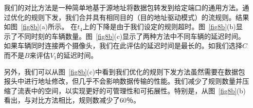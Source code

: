 我们的对比方法是一种简单地基于源地址将数据包转发到给定端口的通用方法。通过优化的规则下发，我们合并具有相同目的（目的地址驱动模式）的流规则。结果如图~\ref{fig8b}(a)所示。 在$t_ {4}$上的下降是由于我们设定的规则超时。图~\ref{fig8b}(b)显示了不同时刻的车辆数量。图~\ref{fig8b}(c)显示了两种方法中不同车辆的延迟时间。如果车辆同时连接两个摄像头，我们在此评估的延迟时间是最长的。如我们选择$C$而不是$B$来评估$V_ {1}$的延迟时间。



另外，我们可以从图~\ref{fig8b}(c)中看到我们优化的规则下发方法虽然需要在数据包报头中进行地址修改，但几乎不会影响数据传输的性能。我们减少了规则数量并压缩了流表中的空间，以实现更好的可管理性和可拓展性。特别是，从图~\ref{fig8b}(b)看出，与对比方法相比，规则数减少了60％。




